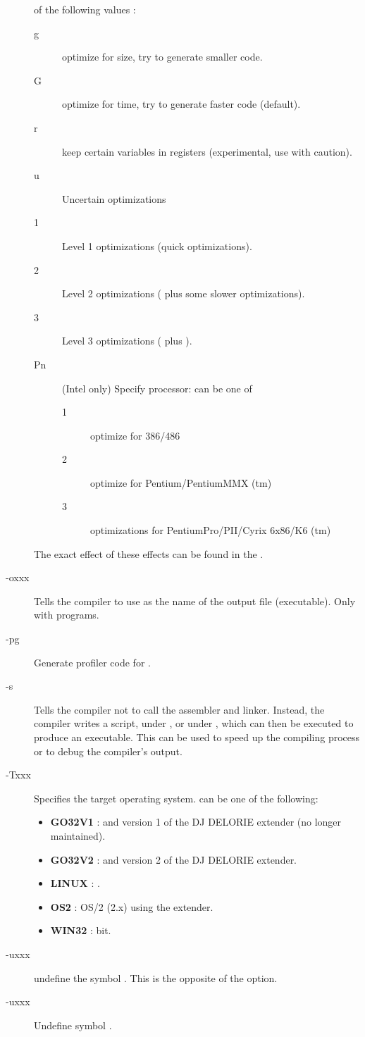 \documentclass{book}
\begin{document}
\begin{description}
of the following values :
\begin{description}
\item[g] optimize for size, try to generate smaller code.
\item[G] optimize for time, try to generate faster code (default).
\item[r] keep certain variables in registers (experimental, use with
caution).
\item[u] Uncertain optimizations
\item[1] Level 1 optimizations (quick optimizations).
\item[2] Level 2 optimizations ( plus some slower optimizations).
\item[3] Level 3 optimizations ( plus ).
\item[Pn] (Intel only) Specify processor:  can be one of
\begin{description}
\item[1] optimize for 386/486
\item[2] optimize for Pentium/PentiumMMX (tm)
\item[3] optimizations for PentiumPro/PII/Cyrix 6x86/K6 (tm)
\end{description}
\end{description}
The exact effect of these effects can be found in the \progref.
\item [-oxxx] Tells the compiler to use  as the name of the output
file (executable). Only with programs.
\item [-pg]  Generate profiler code for .
\item [-s]  Tells the compiler not to call the assembler and linker.
Instead, the compiler writes a script,  under \dos, or
 under \linux, which can then be executed to produce an
executable. This can be used to speed up the compiling process or to debug
the compiler's output.
\item[-Txxx]  Specifies the target operating system.  can be one of
the following:
\begin{itemize}
\item \textbf{GO32V1} : \dos and version 1 of the DJ DELORIE extender (no longer maintained).
\item \textbf{GO32V2} : \dos and version 2 of the DJ DELORIE extender.
\item \textbf{LINUX} : \linux.
\item \textbf{OS2} : OS/2 (2.x) using the  extender.
\item \textbf{WIN32} :  bit.
\end{itemize}
\item [-uxxx]  undefine the symbol . This is the opposite
of the  option.
\item [-uxxx]  Undefine symbol .


\end{description}
\end{document}
